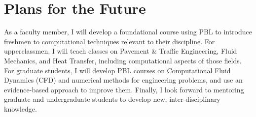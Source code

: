 \documentclass[12pt]{article}
\begin{document}
\section*{Plans for the Future}
As a faculty member, I will develop a foundational course using PBL to introduce freshmen to computational techniques relevant to their discipline. For upperclassmen, I will teach classes on Pavement \& Traffic Engineering, Fluid Mechanics, and Heat Transfer, including computational aspects of those fields. For graduate students, I will develop PBL courses on Computational Fluid Dynamics (CFD) and numerical methods for engineering problems, and use an evidence-based approach to improve them. Finally, I look forward to mentoring graduate and undergraduate students to develop new, inter-disciplinary knowledge.

 

\end{document}
